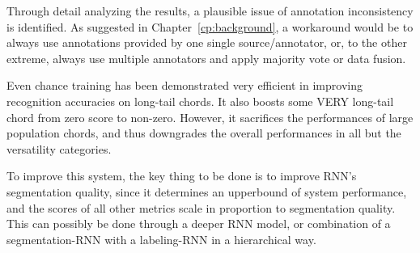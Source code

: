 Through detail analyzing the results, a plausible issue of annotation inconsistency is identified. As suggested in Chapter~\ref{cp:background}, a workaround would be to always use annotations provided by one single source/annotator, or, to the other extreme, always use multiple annotators and apply majority vote or data fusion. %

Even chance training has been demonstrated very efficient in improving recognition accuracies on long-tail chords. It also boosts some VERY long-tail chord from zero score to non-zero. However, it sacrifices the performances of large population chords, and thus downgrades the overall performances in all but the versatility categories.

To improve this system, the key thing to be done is to improve RNN's segmentation quality, since it determines an upperbound of system performance, and the scores of all other metrics scale in proportion to segmentation quality. This can possibly be done through a deeper RNN model, or combination of a segmentation-RNN with a labeling-RNN in a hierarchical way.






